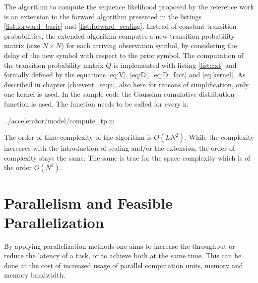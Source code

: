 \documentclass[mscthesis]{usiinfthesis}
\begin{document}
The algorithm to compute the sequence likelihood proposed by the reference work
is an extension to the forward algorithm presented in the listings
\ref{list:forward_basic} and \ref{list:forward_scaling}. Instead of constant
transition probabilities, the extended algorithm computes a new transition
probability matrix (size $ N \times N$) for each arriving observation symbol,
by considering the delay of the new symbol with respect to the prior symbol.
The computation of the transition probability matrix $ Q $ is implemented with
listing \ref{list:ext} and formally defined by the equations \ref{eq:V},
\ref{eq:D}, \ref{eq:D_fact} and \ref{eq:kernel}. As described in chapter
\ref{ch:event_sequ}, also here for reasons of simplification, only one kernel
is used. In the sample code the Gaussian cumulative distribution function is
used. The function needs to be called for every k.


    {../accelerator/model/compute_tp.m}

The order of time complexity of the algorithm is $O(LN^2)$. While the
complexity increases with the introduction of scaling and/or the extension, the
order of complexity stays the same. The same is true for the space complexity
which is of the order $O(N^2)$.

\section{Parallelism and Feasible Parallelization}
\label{ch:analysis_parallel}

By applying parallelization methods one aims to increase the throughput or
reduce the latency of a task, or to achieve both at the same time. This can be
done at the cost of increased usage of parallel computation units, memory and
memory bandwidth.
\end{document}
